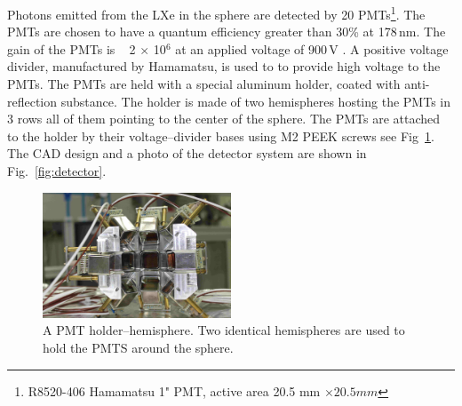 Photons emitted from the LXe in the sphere are detected by 20  PMTs\footnote{R8520-406 Hamamatsu 1" PMT, active area 20.5 mm $\times 20.5 mm$}. 
The PMTs are chosen to have a quantum efficiency greater than 30\% at 178\,nm. The gain of the PMTs is ~ 2 $\times$ 10$^6$ at an applied voltage of 900\,V . A positive voltage divider, 
manufactured by Hamamatsu, is used to to provide high voltage to the PMTs. 
The PMTs are held with a special aluminum holder, coated with anti-reflection substance. 
The holder is made of two hemispheres hosting the PMTs in 3 rows all of them pointing to the 
center of the sphere. The PMTs are attached to the holder by their voltage--divider bases using M2 PEEK screws see Fig~\ref{fig:pmtholder}. 
The CAD design and a photo of the detector system are shown 
in Fig.~\ref{fig:detector}.

\begin{figure}[h]
   \centering
   \includegraphics[width=0.5\textwidth]{PMTholder.JPG}
   \caption{A PMT holder--hemisphere. Two identical hemispheres are used to hold the PMTS around the sphere.} 
   \label{fig:pmtholder}
\end{figure}

